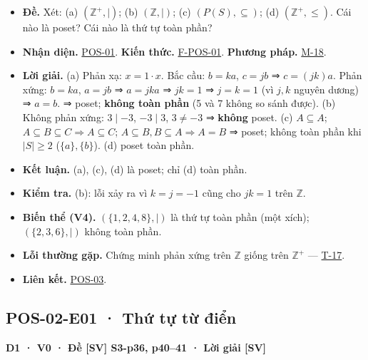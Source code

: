 \documentclass[
  10pt,
  twoside,openany]{book}
\providecommand{\tightlist}{%
  \setlength{\itemsep}{0pt}\setlength{\parskip}{0pt}}
\begin{document}
\begin{itemize}
\tightlist
\item
  \textbf{Đề.} Xét: (a) \((\mathbb Z^+,\mid)\); (b)
  \((\mathbb Z,\mid)\); (c) \((P(S),\subseteq)\); (d)
  \((\mathbb Z^+,\le)\). Cái nào là poset? Cái nào là thứ tự toàn phần?
\item
  \textbf{Nhận diện.} \protect\hyperlink{POS-01}{POS-01}. \textbf{Kiến
  thức.} \protect\hyperlink{F-POS-01}{F-POS-01}. \textbf{Phương pháp.}
  \protect\hyperlink{M-18}{M-18}.
\item
  \textbf{Lời giải.} (a) Phản xạ: \(x=1\cdot x\). Bắc cầu: \(b=ka\),
  \(c=jb\) ⇒ \(c=(jk)a\). Phản xứng: \(b=ka\), \(a=jb\) ⇒ \(a=jka\) ⇒
  \(jk=1\) ⇒ \(j=k=1\) (vì \(j,k\) nguyên dương) ⇒ \(a=b\). ⇒ poset;
  \textbf{không toàn phần} (5 và 7 không so sánh được). (b) Không phản
  xứng: \(3\mid-3\), \(-3\mid3\), \(3\ne-3\) ⇒ \textbf{không} poset. (c)
  \(A\subseteq A\); \(A\subseteq B\subseteq C\Rightarrow A\subseteq C\);
  \(A\subseteq B,B\subseteq A\Rightarrow A=B\) ⇒ poset; không toàn phần
  khi \(|S|\ge2\) (\(\{a\},\{b\}\)). (d) poset toàn phần.
\item
  \textbf{Kết luận.} (a), (c), (d) là poset; chỉ (d) toàn phần.
\item
  \textbf{Kiểm tra.} (b): lỗi xảy ra vì \(k=j=-1\) cũng cho \(jk=1\)
  trên \(\mathbb Z\).
\item
  \textbf{Biến thể (V4).} \((\{1,2,4,8\},\mid)\) là thứ tự toàn phần
  (một xích); \((\{2,3,6\},\mid)\) không toàn phần.
\item
  \textbf{Lỗi thường gặp.} Chứng minh phản xứng trên \(\mathbb Z\) giống
  trên \(\mathbb Z^+\) --- \protect\hyperlink{T-17}{T-17}.
\item
  \textbf{Liên kết.} \protect\hyperlink{POS-03}{POS-03}.
\end{itemize}

\hypertarget{POS-02-E01}{%
\subsection{POS-02-E01 · Thứ tự từ điển}\label{POS-02-E01}}

\textbf{D1 · V0 · Đề {[}SV{]} S3-p36, p40--41 · Lời giải {[}SV{]}}
\end{document}
